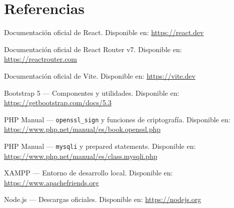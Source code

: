 \documentclass[10pt,letterpaper]{report}
\begin{document}
\chapter{Referencias}

\begin{enumerate}[label={[\arabic*]}]
  \item Documentación oficial de React. Disponible en: \url{https://react.dev}
  \item Documentación oficial de React Router v7. Disponible en: \url{https://reactrouter.com}
  \item Documentación oficial de Vite. Disponible en: \url{https://vite.dev}
  \item Bootstrap 5 — Componentes y utilidades. Disponible en: \url{https://getbootstrap.com/docs/5.3}
  \item PHP Manual — \texttt{openssl\_sign} y funciones de criptografía. Disponible en: \url{https://www.php.net/manual/es/book.openssl.php}
  \item PHP Manual — \texttt{mysqli} y prepared statements. Disponible en: \url{https://www.php.net/manual/es/class.mysqli.php}
  \item XAMPP — Entorno de desarrollo local. Disponible en: \url{https://www.apachefriends.org}
  \item Node.js — Descargas oficiales. Disponible en: \url{https://nodejs.org}
\end{enumerate}
\end{document}
